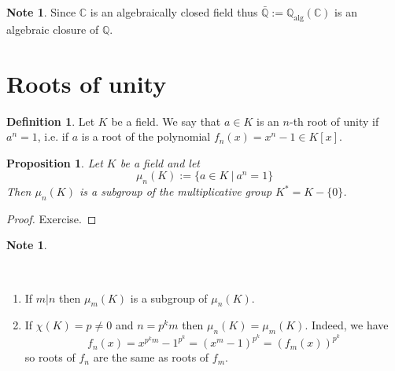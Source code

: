 \documentclass[12pt, letterpaper, oneside]{article}
\theoremstyle{plain}
\newtheorem{proposition}[theorem]{Proposition}
\theoremstyle{definition}
\newtheorem{definition}[theorem]{Definition}
\newtheorem{note}[theorem]{Note}
\newcommand{\Q}{{\mathbb Q}}
\newcommand{\C}{{\mathbb C}}
\newcommand{\benu}{\begin{enumerate}}
\newcommand{\eenu}{\end{enumerate}}
\newcommand{\vs}{\vskip 5mm}
\newcommand{\isep}[1][0]{\setlength{\itemsep}{#1 mm}}
\begin{document}
\vs\vs

\begin{note}
Since $\C$ is an algebraically closed field thus $\bar{\Q} := \Q_{\text{alg}}(\C)$
is an algebraic closure of $\Q$. 
\end{note}








\newpage
\section{Roots of unity}
\label{SEC_ROOTSOFUNITY}

\begin{definition}
Let $K$ be a field. We say that $a\in K$ is an $n$-th root of unity if 
$a^{n} = 1$, i.e.  if  $a$ is a root of the polynomial 
$f_{n}(x) = x^{n} -1 \in K[x]$.  
\end{definition}

\vs\vs

\begin{proposition}
\label{PROP_GPOFROOTSOFUNITY}
Let $K$ be a field and let   
$$\mu_{n}(K) := \{ a\in K \ | \ a^{n} = 1 \}$$
Then $\mu_{n}(K)$ is a subgroup of the multiplicative group $K^{\ast} = K-\{0\}$.
\end{proposition}

\vs


\begin{proof}
Exercise. 
\end{proof}



\vs\vs

\begin{note}\ 
\label{NOTE_ROOTS1PROPS}
\vskip -13mm

\ 
\benu
\isep[5]
\item If $m | n$ then $\mu_{m}(K)$ is a subgroup of $\mu_{n}(K)$. 
\item If $\chi(K) = p\neq 0$ and $n=p^{k}m$ then $\mu_{n}(K) = \mu_{m}(K)$. 
Indeed,  we have 
$$f_{n}(x) = x^{p^{k}m} - 1^{p^{k}} = (x^{m}-1)^{p^{k}} = (f_{m}(x))^{p^{k}}$$
so roots of $f_{n}$ are the same as roots of $f_{m}$. 
\eenu

\end{note}



\vs\vs
\end{document}
